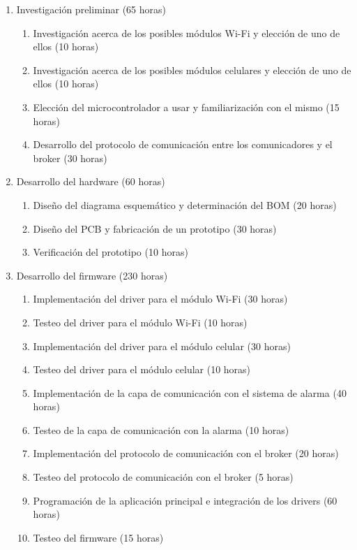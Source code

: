 \documentclass[
11pt, %
codirector, %
]{charter}
\begin{document}
\begin{enumerate}
	\item Investigación preliminar (65 horas)
		\begin{enumerate}
			\item Investigación acerca de los posibles módulos Wi-Fi y elección de uno de ellos (10 horas)
			\item Investigación acerca de los posibles módulos celulares y elección de uno de ellos (10 horas)
			\item Elección del microcontrolador a usar y familiarización con el mismo (15 horas)
			\item Desarrollo del protocolo de comunicación entre los comunicadores y el broker (30 horas)
		\end{enumerate}
	\item Desarrollo del hardware (60 horas)
		\begin{enumerate}
			\item Diseño del diagrama esquemático y determinación del BOM (20 horas)
			\item Diseño del PCB y fabricación de un prototipo (30 horas)
			\item Verificación del prototipo (10 horas)
		\end{enumerate}
	\item Desarrollo del firmware (230 horas)
		\begin{enumerate}
			\item Implementación del driver para el módulo Wi-Fi (30 horas)
			\item Testeo del driver para el módulo Wi-Fi (10 horas)
			\item Implementación del driver para el módulo celular (30 horas)
			\item Testeo del driver para el módulo celular (10 horas)
			\item Implementación de la capa de comunicación con el sistema de alarma (40 horas)
			\item Testeo de la capa de comunicación con la alarma (10 horas)
			\item Implementación del protocolo de comunicación con el broker (20 horas)
			\item Testeo del protocolo de comunicación con el broker (5 horas)
			\item Programación de la aplicación principal e integración de los drivers (60 horas)
			\item Testeo del firmware (15 horas)
		\end{enumerate}

\end{enumerate}
\end{document}
